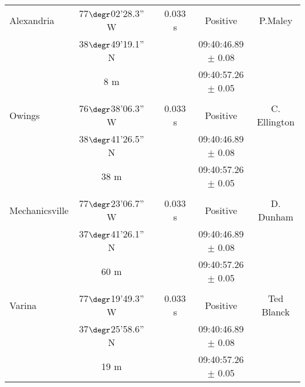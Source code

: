 \begin{table*}
\begin{minipage}{140mm}
\begin{tabular}{@{}lccccc}
 Alexandria & 77$\degr$02'28.3'' W &  & 0.033 s & Positive & P.Maley \\
  &38$\degr$49'19.1'' N &  &     & 09:40:46.89 $\pm$ 0.08 &   \\
            & 8 m                &       &     & 09:40:57.26  $\pm$ 0.05 &   \\
 & & & & & \\
 Owings & 76$\degr$38'06.3'' W &  & 0.033 s & Positive & C. Ellington \\
  &38$\degr$41'26.5'' N &  &     & 09:40:46.89 $\pm$ 0.08 &   \\
            & 38 m                &       &     & 09:40:57.26  $\pm$ 0.05 &   \\
 & & & & & \\
 Mechanicsville & 77$\degr$23'06.7'' W &  & 0.033 s & Positive & D. Dunham \\
  &37$\degr$41'26.1'' N &  &     & 09:40:46.89 $\pm$ 0.08 &   \\
            & 60 m                &       &     & 09:40:57.26  $\pm$ 0.05 &   \\
 & & & & & \\
 Varina & 77$\degr$19'49.3'' W &  & 0.033 s & Positive & Ted Blanck \\
  &37$\degr$25'58.6'' N &  &     & 09:40:46.89 $\pm$ 0.08 &   \\
            & 19 m                &       &     & 09:40:57.26  $\pm$ 0.05 &   \\

\hline
\end{tabular}
\end{minipage}
\end{table*}